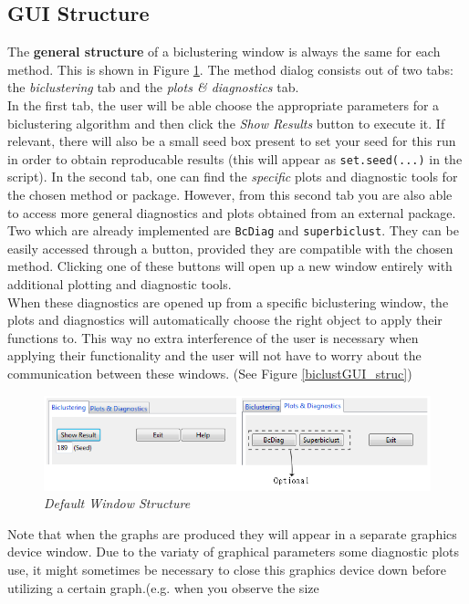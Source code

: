 \documentclass[a4paper]{article}\usepackage[]{graphicx}\usepackage[]{color}
\begin{document}
\subsection{GUI Structure}
The {\bf general structure} of a biclustering window is always 
the same for each method. This is shown in Figure \ref{def_str}. The
method dialog consists out of two tabs: the {\it biclustering} tab and the {\it
plots \& diagnostics} tab. \\
In the first tab, the user will be able choose the appropriate parameters for a
biclustering algorithm and then click the {\it Show Results} button to execute
it. If relevant, there will also be a small seed box present to set your seed
for this run in order to obtain reproducable results (this will appear as
\verb|set.seed(...)| in the script).
In the second tab, one can find the {\it specific} plots and diagnostic
tools for the chosen method or package. However, from this second tab you are also
able to access more general diagnostics and plots obtained from an external package. Two which are already
implemented are \verb|BcDiag| and \verb|superbiclust|. They can be easily
accessed through a button, provided they are compatible with the chosen method.
Clicking one of these buttons will open up a new window entirely with
additional plotting and diagnostic tools.\\
When these diagnostics are opened up from a specific biclustering window, the
plots and diagnostics will automatically choose the right object to apply their
functions to. This way no extra interference of the user is necessary when applying their
functionality and the user will not have to worry about the communication
between these windows. (See Figure \ref{biclustGUI_struc})
\begin{figure}[H]
\centering
\includegraphics[scale=0.5]{figures/standard_buttons.png}
\caption{{\it Default Window Structure}\label{def_str}}
\end{figure}
\noindent Note that when the graphs are produced they will appear in a separate
graphics device window. Due to the variaty of graphical parameters some
diagnostic plots use, it might sometimes be necessary to close this graphics
device down before utilizing a certain graph.(e.g. when you observe the size
\end{document}
